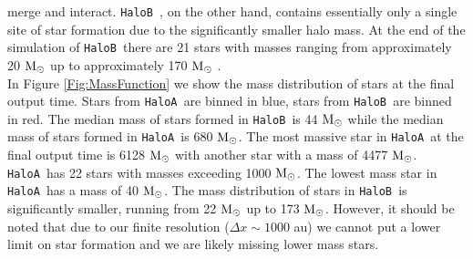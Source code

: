 \documentclass[graphics, twocolumn, usenatbib]{mn2e}
\newcommand{\msolar} {$\rm{M_{\odot}}~$}
\newcommand{\msolarc} {$\rm{M_{\odot}}$}
\newcommand{\ha} {\texttt{HaloA~}}
\newcommand{\hb} {\texttt{HaloB~}}
\begin{document}
merge and interact. \hb, on the other hand, contains essentially only a single site of star formation
due to the significantly smaller halo mass. At the end of the simulation of \hb there are 21 stars
with masses ranging from approximately 20 \msolar up to approximately 170 \msolar.\\
\indent In Figure \ref{Fig:MassFunction} we show the mass distribution of stars at the final
output time. Stars from \ha are binned in blue, stars from \hb are binned in red. The median mass
of stars formed in \hb is 44 \msolar while the median mass of stars formed in \ha is 680 \msolarc.
The most massive star in \ha at the final output time is 6128 \msolar with another star with a mass
of 4477 \msolarc. \ha has 22 stars with masses exceeding 1000 \msolarc. The lowest mass star in
\ha has a mass of 40 \msolarc. The mass distribution of stars in \hb is significantly smaller, running
from 22 \msolar up to 173 \msolarc. However, it should be noted that due to our finite resolution
($\Delta x \sim 1000$ au) we cannot put a lower limit on star formation and we are likely missing lower mass stars. 
\end{document}

